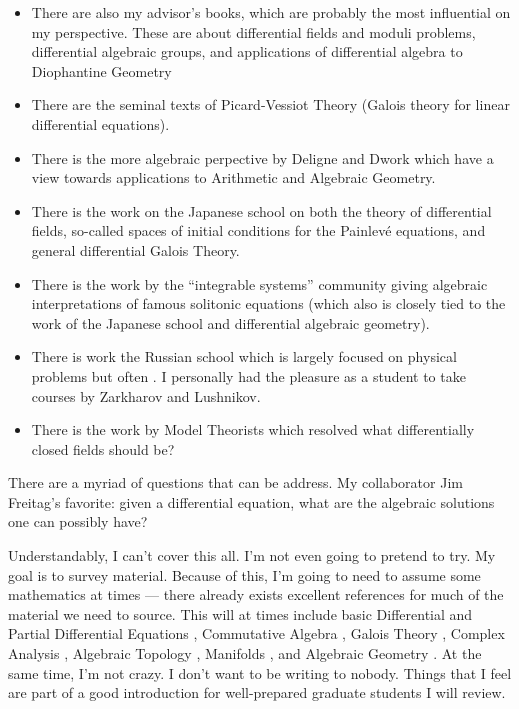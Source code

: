 \documentclass[]{book}
\numberwithin{equation}{section}
\theoremstyle{definition}
\theoremstyle{remark}
\begin{document}
\begin{itemize}
	\item There are also my advisor's books, which are probably the most influential on my perspective. 
	These are about differential fields and moduli problems, differential algebraic groups, and applications of differential algebra to Diophantine Geometry
	\item There are the seminal texts of Picard-Vessiot Theory (Galois theory for linear differential equations). 
	\item There is the more algebraic perpective by Deligne and Dwork which have a view towards applications to Arithmetic and Algebraic Geometry.
	\item There is the work on the Japanese school on both the theory of differential fields, so-called spaces of initial conditions for the Painlev\'{e} equations, and general differential Galois Theory.
	\item There is the work by the ``integrable systems'' community giving algebraic interpretations of famous solitonic equations (which also is closely tied to the work of the Japanese school and differential algebraic geometry). 
	\item There is work the Russian school which is largely focused on physical problems but often . 
	I personally had the pleasure as a student to take courses by  Zarkharov and Lushnikov.
	\item There is the work by Model Theorists which resolved what differentially closed fields should be?
\end{itemize}
There are a myriad of questions that can be address. 
My collaborator Jim Freitag's favorite: given a differential equation, what are the algebraic solutions one can possibly have?




 

Understandably, I can't cover this all. 
I'm not even going to pretend to try. 
My goal is to survey material.
Because of this, I'm going to need to assume some mathematics at times --- there already exists excellent references for much of the material we need to source.  
This will at times include basic Differential \cite{Ince1944} and Partial Differential Equations \cite{Evans2010}, Commutative Algebra \cite{Atiyah2016}, Galois Theory \cite{Cox2012}, Complex Analysis \cite{Ullrich2008}, Algebraic Topology \cite{Hatcher2002}, Manifolds \cite{Lee2013}, and Algebraic Geometry \cite{Vakil2017}. 
At the same time, I'm not crazy. 
I don't want to be writing to nobody. 
Things that I feel are part of a good introduction for well-prepared graduate students I will review. 
\end{document}
